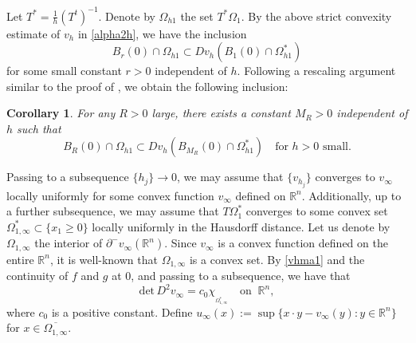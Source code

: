\documentclass[11pt]{amsart}
\theoremstyle{plain}
\newtheorem{corollary}{Corollary}[section]
\renewcommand{\det}{\mbox{det}}
\newcommand{\0}{\textbf{0}}
\numberwithin{equation}{section}
\numberwithin{equation}{section}
\numberwithin{figure}{section}
\begin{document}
Let $T^*=\frac{1}{h}(T^t)^{-1}$.
Denote by $\Omega_{h1}$ the set $T^*\Omega_1$. 
By the above strict convexity estimate of $v_h$ in \eqref{alpha2h}, we have the inclusion 
	$$B_r(0) \cap \Omega_{h1} \subset Dv_h(B_{1}(0) \cap \Omega^*_{h1})$$
for some small constant $r > 0$ independent of $h$. Following a rescaling argument similar to the proof of \cite[Lemma 5.15]{CLW3}, we obtain the following inclusion:
\begin{corollary}\label{goodinclu}
For any $R > 0$ large, there exists a constant $M_R > 0$ independent of $h$ such that 
\begin{equation}\label{ginl}
	B_R(0) \cap \Omega_{h1} \subset Dv_h(B_{M_R}(0) \cap \Omega^*_{h1}) \quad\text{for $h>0$ small.}
\end{equation}
\end{corollary}


Passing to a subsequence \( \{h_j\} \to 0 \), we may assume that \( \{v_{h_j}\} \) converges to \( v_{\infty} \) locally uniformly for some convex function \( v_{\infty} \) defined on \( \mathbb{R}^n \). 
Additionally, up to a further subsequence, we may assume that \( T\Omega_1^* \) converges to some convex set \( \Omega_{1,\infty}^* \subset \{x_1\geq 0\} \) locally uniformly in the Hausdorff distance. 
Let us denote by \( \Omega_{1,\infty} \) the interior of \( \partial^- v_{\infty}(\mathbb{R}^n) \). 
Since \( v_{\infty} \) is a convex function defined on the entire \( \mathbb{R}^n \), it is well-known that \( \Omega_{1,\infty} \) is a convex set. 
By \eqref{vhma1} and the continuity of \( f \) and \( g \) at \( 0 \), and passing to a subsequence, we have that
\begin{equation}\label{vhma2}
\det\, D^2v_{\infty} = c_0 \chi_{_{\Omega_{1,\infty}^*}} \quad \text{on } \ \mathbb{R}^n,
\end{equation}
where $c_0$ is a positive constant.
Define \( u_{\infty}(x) := \sup \{ x \cdot y - v_{\infty}(y) : y \in \mathbb{R}^n \} \) for \( x \in \overline{\Omega_{1,\infty}} \).
\end{document}
